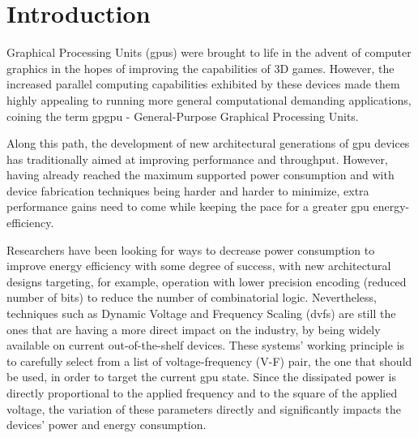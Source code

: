 
\chapter{Introduction}
\label{chapter:introduction}

Graphical Processing Units (\acrshort{gpu}s) were brought to life in the advent of computer graphics in the hopes of improving the capabilities of 3D games. However, the increased parallel computing capabilities exhibited by these devices made them highly appealing to running more general computational demanding applications, coining the term \acrshort{gpgpu} - General-Purpose Graphical Processing Units.

Along this path, the development of new architectural generations of \acrshort{gpu} devices has traditionally aimed at improving performance and throughput. However, having already reached the maximum supported power consumption and with device fabrication techniques being harder and harder to minimize, extra performance gains need to come while keeping the pace for a greater \acrshort{gpu} energy-efficiency.

Researchers have been looking for ways to decrease power consumption to improve energy efficiency with some degree of success, with new architectural designs targeting, for example, operation with lower precision encoding (reduced number of bits) to reduce the number of combinatorial logic. Nevertheless, techniques such as Dynamic Voltage and Frequency Scaling (\acrshort{dvfs}) are still the ones that are having a more direct impact on the industry, by being widely available on current out-of-the-shelf devices. These systems' working principle is to carefully select from a list of voltage-frequency (V-F) pair, the one that should be used, in order to target the current \acrshort{gpu} state. Since the dissipated power is directly proportional to the applied frequency and to the square of the applied voltage, the variation of these parameters directly and significantly impacts the devices' power and energy consumption.

